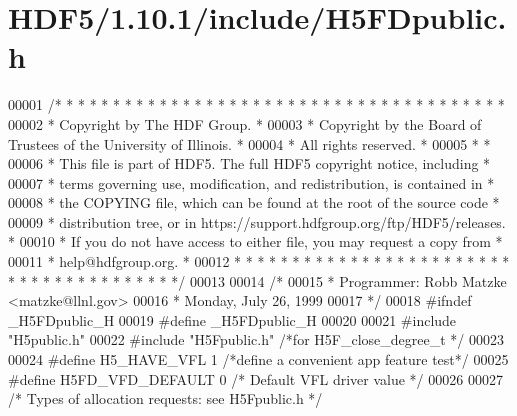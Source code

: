 \hypertarget{_h_d_f5_21_810_81_2include_2_h5_f_dpublic_8h_source}{}\section{H\+D\+F5/1.10.1/include/\+H5\+F\+Dpublic.h}
\label{_h_d_f5_21_810_81_2include_2_h5_f_dpublic_8h_source}

\begin{DoxyCode}
00001 \textcolor{comment}{/* * * * * * * * * * * * * * * * * * * * * * * * * * * * * * * * * * * * * * *}
00002 \textcolor{comment}{ * Copyright by The HDF Group.                                               *}
00003 \textcolor{comment}{ * Copyright by the Board of Trustees of the University of Illinois.         *}
00004 \textcolor{comment}{ * All rights reserved.                                                      *}
00005 \textcolor{comment}{ *                                                                           *}
00006 \textcolor{comment}{ * This file is part of HDF5.  The full HDF5 copyright notice, including     *}
00007 \textcolor{comment}{ * terms governing use, modification, and redistribution, is contained in    *}
00008 \textcolor{comment}{ * the COPYING file, which can be found at the root of the source code       *}
00009 \textcolor{comment}{ * distribution tree, or in https://support.hdfgroup.org/ftp/HDF5/releases.  *}
00010 \textcolor{comment}{ * If you do not have access to either file, you may request a copy from     *}
00011 \textcolor{comment}{ * help@hdfgroup.org.                                                        *}
00012 \textcolor{comment}{ * * * * * * * * * * * * * * * * * * * * * * * * * * * * * * * * * * * * * * */}
00013 
00014 \textcolor{comment}{/*}
00015 \textcolor{comment}{ * Programmer:  Robb Matzke <matzke@llnl.gov>}
00016 \textcolor{comment}{ *              Monday, July 26, 1999}
00017 \textcolor{comment}{ */}
00018 \textcolor{preprocessor}{#ifndef \_H5FDpublic\_H}
00019 \textcolor{preprocessor}{#define \_H5FDpublic\_H}
00020 
00021 \textcolor{preprocessor}{#include "H5public.h"}
00022 \textcolor{preprocessor}{#include "H5Fpublic.h"}      \textcolor{comment}{/*for H5F\_close\_degree\_t */}
00023 
00024 \textcolor{preprocessor}{#define H5\_HAVE\_VFL 1 }\textcolor{comment}{/*define a convenient app feature test*/}\textcolor{preprocessor}{}
00025 \textcolor{preprocessor}{#define H5FD\_VFD\_DEFAULT 0   }\textcolor{comment}{/* Default VFL driver value */}\textcolor{preprocessor}{}
00026 
00027 \textcolor{comment}{/* Types of allocation requests: see H5Fpublic.h  */}

\end{DoxyCode}
